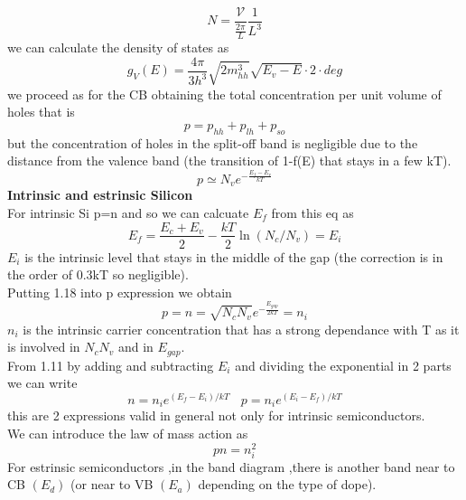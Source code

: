 \begin{equation}
N=\frac{\mathcal{V}}{\frac{2\pi}{L}}\frac{1}{L^3}
\end{equation}
we can calculate the density of states as
\begin{equation}
g_V(E)=\frac{4\pi}{3h^3}\sqrt{2m_{hh}^3}\sqrt{E_v-E}\cdot 2 \cdot deg
\end{equation}
we proceed as for the CB obtaining the total concentration per unit volume of holes that is 
\begin{equation}
p=p_{hh}+p_{lh}+p_{so}
\end{equation}
but the concentration of holes in the split-off band is negligible due to the distance from the valence band (the transition of 1-f(E) that stays in a few kT).\\
\begin{equation}
p\simeq N_v e^{-\frac{E_f-E_v}{kT}}
\end{equation}
\newline
{\bf Intrinsic and estrinsic Silicon}\\
For intrinsic Si p=n and so we can calcuate $E_f$ from this eq as
\begin{equation}
E_f=\frac{E_c+E_v}{2}-\frac{kT}{2}\ln(N_c/N_v)=E_i 
\end{equation}
$E_i$ is the intrinsic level that stays in the middle of the gap (the correction is in the order of 0.3kT so negligible).\\
Putting 1.18 into p expression we obtain
\begin{equation}
p=n=\sqrt{N_cN_v}e^{-\frac{E_{gap}}{2kT}}=n_i
\end{equation}
$n_i$ is the intrinsic carrier concentration that has a strong dependance with T as it is involved in $N_c N_v$ and in $E_{gap}$.\\
From 1.11 by adding and subtracting $E_i$ and dividing the exponential in 2 parts we can write 
\begin{equation}
n=n_ie^{(E_f-E_i)/kT}\ \ \ \ p=n_ie^{(E_i-E_f)/kT}
\end{equation}
this are 2 expressions valid in general not only for intrinsic semiconductors.\\
We can introduce the law of mass action as 
\begin{equation}
pn=n_i^2
\end{equation}
For estrinsic semiconductors ,in the band diagram ,there is another band near to CB $(E_d)$ (or near to VB $(E_a)$ depending on the type of dope).\\
